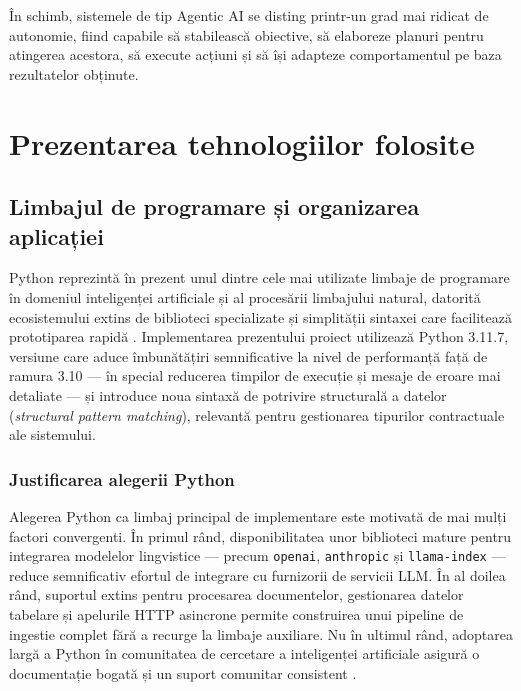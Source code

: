 \documentclass[12pt, a4paper, oneside, romanian]{teza-upb}
\begin{document}
În schimb, sistemele de tip Agentic AI se disting printr-un grad mai ridicat de autonomie, fiind capabile să stabilească obiective, să elaboreze planuri pentru atingerea acestora, să execute acțiuni și să își adapteze comportamentul pe baza rezultatelor obținute. \cite{agentic_medium}



\cleardoublepage
\chapter{Prezentarea tehnologiilor folosite}

\section{Limbajul de programare și organizarea aplicației}

Python reprezintă în prezent unul dintre cele mai utilizate limbaje de programare în domeniul inteligenței artificiale și al procesării limbajului natural, datorită ecosistemului extins de biblioteci specializate și simplității sintaxei care facilitează prototiparea rapidă \cite{python310}. Implementarea prezentului proiect utilizează Python 3.11.7, versiune care aduce îmbunătățiri semnificative la nivel de performanță față de ramura 3.10 — în special reducerea timpilor de execuție și mesaje de eroare mai detaliate — și introduce noua sintaxă de potrivire structurală a datelor (\textit{structural pattern matching}), relevantă pentru gestionarea tipurilor contractuale ale sistemului.

\subsection{Justificarea alegerii Python}

Alegerea Python ca limbaj principal de implementare este motivată de mai mulți factori convergenti. În primul rând, disponibilitatea unor biblioteci mature pentru integrarea modelelor lingvistice — precum \texttt{openai}, \texttt{anthropic} și \texttt{llama-index} — reduce semnificativ efortul de integrare cu furnizorii de servicii LLM. În al doilea rând, suportul extins pentru procesarea documentelor, gestionarea datelor tabelare și apelurile HTTP asincrone permite construirea unui pipeline de ingestie complet fără a recurge la limbaje auxiliare. Nu în ultimul rând, adoptarea largă a Python în comunitatea de cercetare a inteligenței artificiale asigură o documentație bogată și un suport comunitar consistent \cite{goodfellow2016}.
\end{document}
